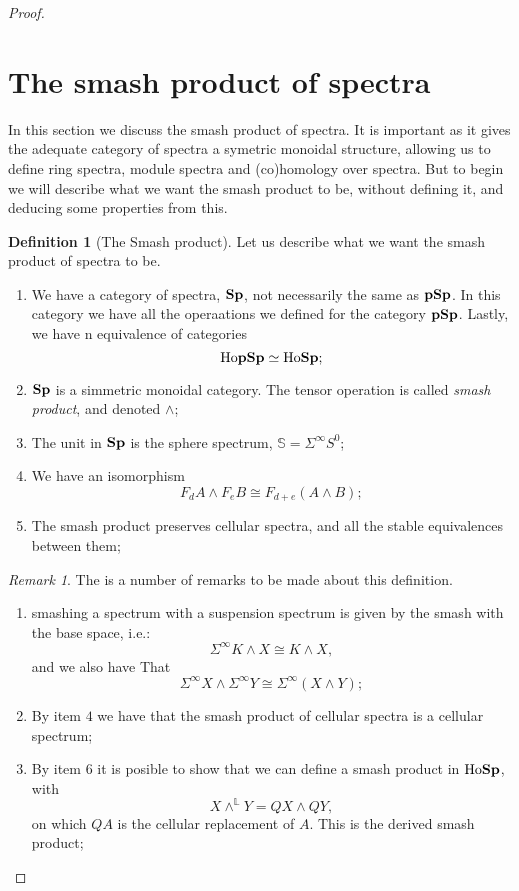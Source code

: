 \documentclass[a4paper,english,11pt]{article}
\theoremstyle{definition}
\newtheorem{Def}{Definition}
\theoremstyle{plain}
\theoremstyle{remark}
\newtheorem{rem}{\color{red}Remark}
\newcommand{\pSp}{\textbf{\text{pSp}}}
\newcommand{\Sp}{\textbf{\text{Sp}}}
\newcommand{\Susp}{\Sigma^{\infty}}
\begin{document}
\begin{proof}
\section{The smash product of spectra}
In this section we discuss the smash product of spectra. It is important as it gives the adequate category of spectra a symetric monoidal structure, allowing us to define ring spectra, module spectra and (co)homology  over spectra. But to begin we will describe what we want the smash product to be, without defining it, and deducing some properties from this.
\begin{Def}[The Smash product]
  Let us describe what we want the smash product of spectra to be. 
  \begin{enumerate}
    \item We have a category of spectra, \(\Sp\), not necessarily the same as \(\pSp\). In this category we have all the operaations we defined for the category \(\pSp\). Lastly, we have n equivalence of categories
    \[\text{Ho}\pSp\simeq\text{Ho}\Sp;\]
    \item \(\Sp\) is a simmetric monoidal category. The tensor operation is called \textit{smash product}, and denoted \(\wedge\);
    \item The unit in \(\Sp\) is the sphere spectrum, \(\mathbb{S}=\Susp S^0\);
    \item We have an isomorphism
    \[F_dA\wedge F_eB\cong F_{d+e}(A\wedge B);\]
    \item The smash product preserves cellular spectra, and all the stable equivalences between them;
  \end{enumerate}
\end{Def} 
\begin{rem}
  The is a number of remarks to be made about this definition.
  \begin{enumerate}
    \item smashing a spectrum with a suspension spectrum is given by the smash with the base space, i.e.:
    \[\Susp K\wedge X\cong K\wedge X,\]
    and we also have That
    \[\Susp X\wedge \Susp Y\cong \Susp(X\wedge Y);\]
    \item By item \(4\) we have that the smash product of cellular spectra is a cellular spectrum;
    \item By item \(6\) it is posible to show that we can define a smash product in \(\text{Ho}\Sp\), with
    \[X\wedge^{\mathbb{L}}Y=QX\wedge QY,\]
    on which \(QA\) is the cellular replacement of \(A\). This is the derived smash product;
  \end{enumerate}

\end{rem}
\end{proof}
\end{document}
